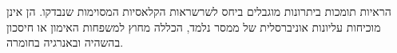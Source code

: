 \begin{otherlanguage}{hebrew}
\begin{justify}
הראיות תומכות ביתרונות מוגבלים ביחס לשרשראות הקלאסיות המסוימות שנבדקו. הן אינן מוכיחות עליונות אוניברסלית של ממסר נלמד, הכללה מחוץ למשפחות האימון או חיסכון בהשהיה ובאנרגיה בחומרה.
\end{justify}
\end{otherlanguage}
